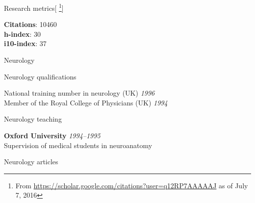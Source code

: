 \documentclass{cv}
\newcommand{\PlaceDateNote}[3]{{\bf #1} \hfill {\em #2} \\#3}
\begin{document}
\begin{cvSection}{Research metrics}[
    \footnote{ From
    \url{https://scholar.google.com/citations?user=q12RP7AAAAAJ} as of July 7,
2016}]

{\bf Citations}: 10460 \\
{\bf h-index}: 30 \\
{\bf i10-index}: 37

\end{cvSection}

\begin{cvSection}{Neurology}

\begin{cvSubSection}{Neurology qualifications}

National training number in neurology (UK) \hfill {\em 1996} \\
Member of the Royal College of Physicians (UK) \hfill {\em 1994}

\end{cvSubSection}

\begin{cvSubSection}{Neurology teaching}

\PlaceDateNote{Oxford University}{1994--1995}{
Supervision of medical students in neuroanatomy}

\end{cvSubSection}

\begin{cvSubSection}{Neurology articles}

\printbibliography[heading=none,
    keyword=neurology,
notkeyword=omit]

\end{cvSubSection}

\end{cvSection}
\end{document}
